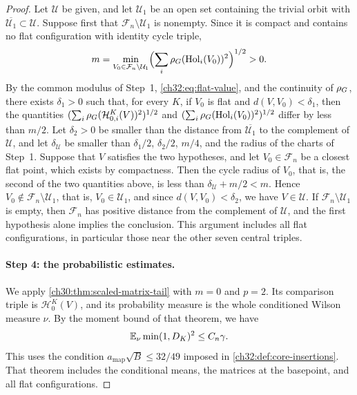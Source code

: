 \begin{proof}
Let $\mathcal U$ be given, and let $\mathcal U_1$ be an open set containing the trivial orbit with $\overline{\mathcal U_1}\subset\mathcal U$. Suppose first that $\mathcal F_n\setminus\mathcal U_1$ is nonempty. Since it is compact and contains no flat configuration with identity cycle triple,
\[
 m=\min_{V_0\in\mathcal F_n\setminus\mathcal U_1}\Bigl(\sum_i\rho_G(\operatorname{Hol}_i(V_0))^2\Bigr)^{1/2}>0.
\]
By the common modulus of Step~1, \eqref{ch32:eq:flat-value}, and the continuity of $\rho_G$, there exists $\delta_1>0$ such that, for every $K$, if $V_0$ is flat and $d(V,V_0)<\delta_1$, then the quantities $(\sum_i\rho_G(\mathcal H^K_{0,i}(V))^2)^{1/2}$ and $(\sum_i\rho_G(\operatorname{Hol}_i(V_0))^2)^{1/2}$ differ by less than $m/2$. Let $\delta_2>0$ be smaller than the distance from $\overline{\mathcal U_1}$ to the complement of $\mathcal U$, and let $\delta_{\mathcal U}$ be smaller than $\delta_1/2$, $\delta_2/2$, $m/4$, and the radius of the charts of Step~1. Suppose that $V$ satisfies the two hypotheses, and let $V_0\in\mathcal F_n$ be a closest flat point, which exists by compactness. Then the cycle radius of $V_0$, that is, the second of the two quantities above, is less than $\delta_{\mathcal U}+m/2<m$. Hence $V_0\notin\mathcal F_n\setminus\mathcal U_1$, that is, $V_0\in\mathcal U_1$, and since $d(V,V_0)<\delta_2$, we have $V\in\mathcal U$. If $\mathcal F_n\setminus\mathcal U_1$ is empty, then $\mathcal F_n$ has positive distance from the complement of $\mathcal U$, and the first hypothesis alone implies the conclusion. This argument includes all flat configurations, in particular those near the other seven central triples.

\paragraph{Step 4: the probabilistic estimates.}
We apply \cref{ch30:thm:scaled-matrix-tail} with $m=0$ and $p=2$. Its comparison triple is $\mathcal H^K_0(V)$, and its probability measure is the whole conditioned Wilson measure $\nu$. By the moment bound of that theorem, we have
\[
 \mathbb E_\nu\min(1,D_K)^2\le C_n\gamma.
\]
This uses the condition $a_{\mathrm{map}}\sqrt B\le32/49$ imposed in \cref{ch32:def:core-insertions}. That theorem includes the conditional means, the matrices at the basepoint, and all flat configurations.


\end{proof}
